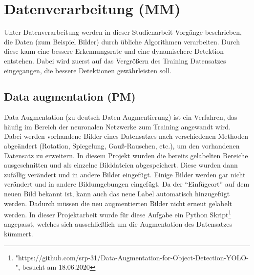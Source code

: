 \documentclass[a4paper,oneside,12pt]{report}
\begin{document}
	\chapter{Datenverarbeitung (MM)}
	Unter Datenverarbeitung werden in dieser Studienarbeit Vorgänge beschrieben, die Daten (zum Beispiel Bilder) durch übliche Algorithmen verarbeiten. Durch diese kann eine bessere Erkennungsrate und eine dynamischere Detektion entstehen. Dabei wird zuerst auf das Vergrößern des Training Datensatzes eingegangen, die bessere Detektionen gewährleisten soll.
	\begin{onehalfspace}
	
	\section{Data augmentation (PM)}
	\begin{onehalfspace}
		Data Augmentation (zu deutsch Daten Augmentierung) ist ein Verfahren, das häufig im Bereich der neuronalen Netzwerke zum Training angewandt wird. Dabei werden vorhandene Bilder eines Datensatzes nach verschiedenen Methoden abgeändert (Rotation, Spiegelung, Gauß-Rauschen, etc.), um den vorhandenen Datensatz zu erweitern. In diesem Projekt wurden die bereits gelabelten Bereiche ausgeschnitten und als einzelne Bilddateien abgespeichert. Diese wurden dann zufällig verändert und in andere Bilder eingefügt. Einige Bilder werden gar nicht verändert und in andere Bildumgebungen eingefügt. Da der "`Einfügeort"' auf dem neuen Bild bekannt ist, kann auch das neue Label automatisch hinzugefügt werden. Dadurch müssen die neu augmentierten Bilder nicht erneut gelabelt werden. In dieser Projektarbeit wurde für diese Aufgabe ein Python Skript\footnote{"https://github.com/srp-31/Data-Augmentation-for-Object-Detection-YOLO-", besucht am 18.06.2020} angepasst, welches sich ausschließlich um die Augmentation des Datensatzes kümmert. 
	\end{onehalfspace}
	

\end{onehalfspace}
\end{document}

